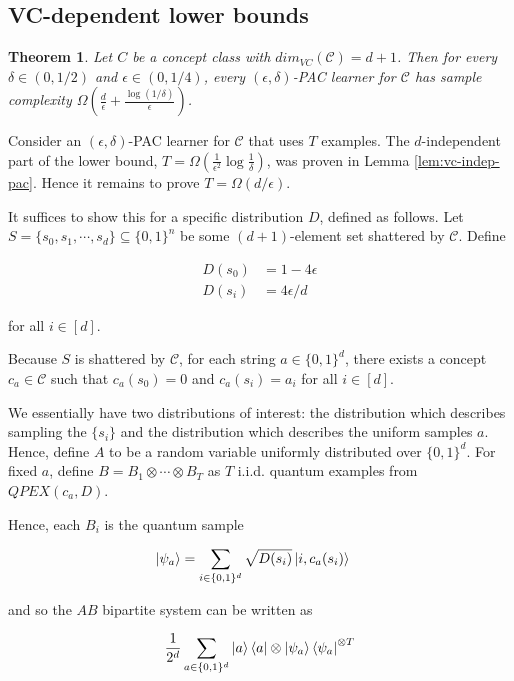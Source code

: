 \documentclass[12]{amsart}
\newcommand\0{\mathbf{0}}
\newcommand\<{\langle}
\renewcommand\>{\rangle}
\newtheorem{theorem}{Theorem}[section]
\begin{document}
\subsection{VC-dependent lower bounds}

\begin{theorem}\label{thm:vc-dep-it}
Let $C$ be a concept class with $dim_{VC}(\mathcal{C}) = d + 1$. Then for every $\delta \in (0,1/2)$ and $\epsilon \in (0,1/4)$, every $(\epsilon,\delta)$-PAC learner for $\mathcal{C}$ has sample complexity $\Omega(\frac{d}{\epsilon} + \frac{\log(1/\delta)}{\epsilon})$.
\end{theorem}

Consider an $(\epsilon,\delta)$-PAC learner for $\mathcal{C}$ that uses $T$ examples. The $d$-independent part of the lower bound, $T = \Omega(\frac{1}{\epsilon^2}\log \frac{1}{\delta})$, was proven in Lemma \ref{lem:vc-indep-pac}. Hence it remains to prove $T = \Omega(d/\epsilon)$. 

It suffices to show this for a specific distribution $D$, defined as follows. Let $S = \{s_0,s_1,\cdots,s_d\} \subseteq \{0,1\}^n$ be some $(d + 1)$-element set shattered by $\mathcal{C}$. Define 

\begin{align}
D(s_0) &= 1-4\epsilon\\
D(s_i) &= 4\epsilon/d 	
\end{align}

for all $i \in [d]$.

Because $S$ is shattered by $\mathcal{C}$, for each string $a \in \{0, 1\}^d$, there exists a concept $c_a \in \mathcal{C}$ such that $c_a(s_0) = 0$ and $c_a(s_i) = a_i$ for all $i \in [d]$.

We essentially have two distributions of interest: the distribution which describes sampling the $\{ s_i\}$ and the distribution which describes the uniform samples $a$. Hence, define $A$ to be a random variable uniformly distributed over $\{0, 1\}^d$. For fixed $a$, define $B = B_1 \otimes \cdots \otimes B_T$ as $T$ i.i.d. quantum examples from $QPEX(c_a, D)$. 

Hence, each $B_i$ is the quantum sample

\begin{align*}
\ket{\psi_a} &= \sum_{i \in \{ 0,1\}^d} \sqrt{D(s_i)} \ket{i, c_a(s_i)}	
\end{align*}

and so the $AB$ bipartite system can be written as

\begin{align*}
	\frac{1}{2^d} \sum_{a \in \{0,1\}^d} \ket{a}\bra{a} \otimes \ket{\psi_a} \bra{\psi_a}^{\otimes T}
\end{align*}
\end{document}
